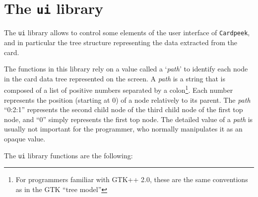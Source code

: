 \documentclass[11pt]{report}
\begin{document}
\section{The \texttt{ui} library}

The \texttt{ui} library allows to control some elements of the user interface of 
\texttt{Cardpeek}, and in particular the tree structure representing the data 
extracted from the card.

The functions in this library rely on a value called a `\emph{path}' to identify 
each node in the card data tree represented on the screen.
A \emph{path} is a string that is composed of a list of positive numbers separated 
by a colon\footnote{For programmers familiar with GTK++ 2.0, these are the same 
conventions as in the GTK ``tree model''}. 
Each number represents the position (starting at 0) of a node relatively to its parent.
The \emph{path} ``0:2:1'' represents the second child node of the third child 
node of the first top node, and ``0'' simply represents the first top node.
The detailed value of a \emph{path} is usually not important for the programmer, 
who normally manipulates it as an opaque value. 

The \texttt{ui} library functions are the following:
\end{document}
